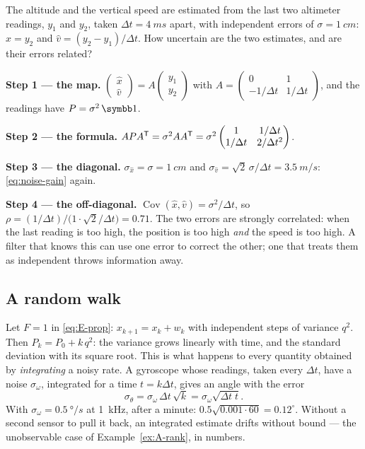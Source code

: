 \begin{example}
\label{ex:E-posvel}
The altitude and the vertical speed are estimated from the last two altimeter readings, $y_1$ and $y_2$, taken $\Delta t = \SI{4}{ms}$ apart, with independent errors of $\sigma = \SI{1}{cm}$: $\hat x = y_2$ and $\hat v = (y_2 - y_1)/\Delta t$. How uncertain are the two estimates, and are their errors related?

\textbf{Step 1 — the map.} $\begin{pmatrix}\hat x\\ \hat v\end{pmatrix} = A\begin{pmatrix}y_1\\ y_2\end{pmatrix}$ with $A = \begin{pmatrix}0 & 1\\ -1/\Delta t & 1/\Delta t\end{pmatrix}$, and the readings have $P = \sigma^2\,\Id$.

\textbf{Step 2 — the formula.} $APA^{\mathsf{T}} = \sigma^2AA^{\mathsf{T}} = \sigma^2\begin{pmatrix}1 & 1/\Delta t\\ 1/\Delta t & 2/\Delta t^2\end{pmatrix}$.

\textbf{Step 3 — the diagonal.} $\sigma_{\hat x} = \sigma = \SI{1}{cm}$ and $\sigma_{\hat v} = \sqrt2\,\sigma/\Delta t = \SI{3.5}{m/s}$: \cref{eq:noise-gain} again.

\textbf{Step 4 — the off-diagonal.} $\operatorname{Cov}(\hat x, \hat v) = \sigma^2/\Delta t$, so $\rho = (1/\Delta t)\big/\big(1 \cdot \sqrt2/\Delta t\big) = 0.71$. The two errors are strongly correlated: when the last reading is too high, the position is too high \emph{and} the speed is too high. A filter that knows this can use one error to correct the other; one that treats them as independent throws information away.
\end{example}

\subsection{A random walk}
Let $F = 1$ in \cref{eq:E-prop}: $x_{k+1} = x_k + w_k$ with independent steps of variance $q^2$. Then $P_k = P_0 + k\,q^2$: the variance grows linearly with time, and the standard deviation with its square root. This is what happens to every quantity obtained by \emph{integrating} a noisy rate. A gyroscope whose readings, taken every $\Delta t$, have a noise $\sigma_\omega$, integrated for a time $t = k\Delta t$, gives an angle with the error
\begin{equation}
  \sigma_\theta = \sigma_\omega\,\Delta t\,\sqrt{k} = \sigma_\omega\sqrt{\Delta t\;t} .
\end{equation}
With $\sigma_\omega = \SI{0.5}{\degree/s}$ at \SI{1}{kHz}, after a minute: $0.5\sqrt{0.001 \cdot 60} = 0.12^\circ$. Without a second sensor to pull it back, an integrated estimate drifts without bound — the unobservable case of Example~\ref{ex:A-rank}, in numbers.

